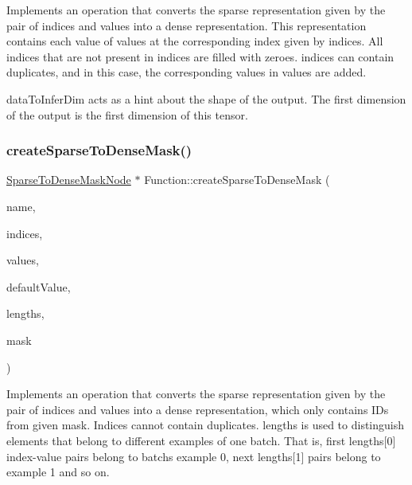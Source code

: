 Implements an operation that converts the sparse representation given by the pair of {\ttfamily indices} and {\ttfamily values} into a dense representation. This representation contains each value of {\ttfamily values} at the corresponding index given by {\ttfamily indices}. All indices that are not present in {\ttfamily indices} are filled with zeroes. {\ttfamily indices} can contain duplicates, and in this case, the corresponding values in {\ttfamily values} are added.

{\ttfamily data\+To\+Infer\+Dim} acts as a hint about the shape of the output. The first dimension of the output is the first dimension of this tensor. \mbox{\label{classglow_1_1_function_a40c8dca4c538dfdf2d248bdb2c8d680a}} 
\subsubsection{\texorpdfstring{create\+Sparse\+To\+Dense\+Mask()}{createSparseToDenseMask()}}
{\footnotesize\ttfamily \hyperlink{classglow_1_1_sparse_to_dense_mask_node}{Sparse\+To\+Dense\+Mask\+Node} $\ast$ Function\+::create\+Sparse\+To\+Dense\+Mask (\begin{DoxyParamCaption}\item[{llvm\+::\+String\+Ref}]{name,  }\item[{\hyperlink{structglow_1_1_node_value}{Node\+Value}}]{indices,  }\item[{\hyperlink{structglow_1_1_node_value}{Node\+Value}}]{values,  }\item[{\hyperlink{structglow_1_1_node_value}{Node\+Value}}]{default\+Value,  }\item[{\hyperlink{structglow_1_1_node_value}{Node\+Value}}]{lengths,  }\item[{llvm\+::\+Array\+Ref$<$ int64\+\_\+t $>$}]{mask }\end{DoxyParamCaption})}

Implements an operation that converts the sparse representation given by the pair of {\ttfamily indices} and {\ttfamily values} into a dense representation, which only contains I\+Ds from given {\ttfamily mask}. Indices cannot contain duplicates. {\ttfamily lengths} is used to distinguish elements that belong to different examples of one batch. That is, first {\ttfamily lengths}\mbox{[}0\mbox{]} index-\/value pairs belong to batch\textquotesingle{}s example 0, next {\ttfamily lengths}\mbox{[}1\mbox{]} pairs belong to example 1 and so on. \mbox{\label{classglow_1_1_function_a9f77fd01d257c12ce44d64ee25c9a65f}} 
